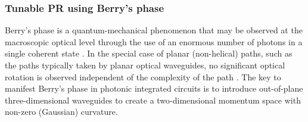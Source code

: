 \documentclass[../report.tex]{subfiles}
\begin{document}
\begin{itemize}[leftmargin=*]
		\subsubsection{Tunable PR using Berry's phase} \label{concept:berry_phase} Berry’s phase is a quantum-mechanical phenomenon that may be observed at the macroscopic optical level through the use of an enormous number of photons in a single coherent state \cite{chiao_manifestations_1986}. In the special case of planar (non-helical) paths, such as the paths typically taken by planar optical waveguides, no significant optical rotation is observed independent of the complexity of the path \cite{tomita_observation_1986}. The key to manifest Berry’s phase in photonic integrated circuits is to introduce out-of-plane three-dimensional waveguides to create a two-dimensional momentum space with non-zero (Gaussian) curvature.
		
	\end{itemize}
	
\end{document}
